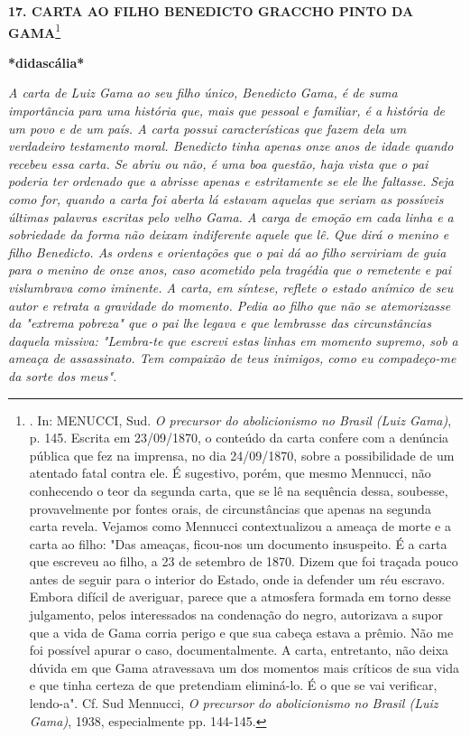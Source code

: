 \textbf{17. CARTA AO FILHO BENEDICTO GRACCHO PINTO DA GAMA}\footnote{.
  In: MENUCCI, Sud. \emph{O precursor do abolicionismo no Brasil (Luiz
  Gama)}, p. 145. Escrita em 23/09/1870, o conteúdo da carta confere com
  a denúncia pública que fez na imprensa, no dia 24/09/1870, sobre a
  possibilidade de um atentado fatal contra ele. É sugestivo, porém, que
  mesmo Mennucci, não conhecendo o teor da segunda carta, que se lê na
  sequência dessa, soubesse, provavelmente por fontes orais, de
  circunstâncias que apenas na segunda carta revela. Vejamos como
  Mennucci contextualizou a ameaça de morte e a carta ao filho: "Das
  ameaças, ficou-nos um documento insuspeito. É a carta que escreveu ao
  filho, a 23 de setembro de 1870. Dizem que foi traçada pouco antes de
  seguir para o interior do Estado, onde ia defender um réu escravo.
  Embora difícil de averiguar, parece que a atmosfera formada em torno
  desse julgamento, pelos interessados na condenação do negro,
  autorizava a supor que a vida de Gama corria perigo e que sua cabeça
  estava a prêmio. Não me foi possível apurar o caso, documentalmente. A
  carta, entretanto, não deixa dúvida em que Gama atravessava um dos
  momentos mais críticos de sua vida e que tinha certeza de que
  pretendiam eliminá-lo. É o que se vai verificar, lendo-a". Cf. Sud
  Mennucci, \emph{O precursor} \emph{do abolicionismo no Brasil (Luiz
  Gama)}, 1938, especialmente pp. 144-145.}

\textbf{*didascália*}

\emph{A carta de Luiz Gama ao seu filho único, Benedicto Gama, é de suma
importância para uma história que, mais que pessoal e familiar, é a
história de um povo e de um país. A carta possui características que
fazem dela um verdadeiro testamento moral. Benedicto tinha apenas onze
anos de idade quando recebeu essa carta. Se abriu ou não, é uma boa
questão, haja vista que o pai poderia ter ordenado que a abrisse apenas
e estritamente se ele lhe faltasse. Seja como for, quando a carta foi
aberta lá estavam aquelas que seriam as possíveis últimas palavras
escritas pelo velho Gama. A carga de emoção em cada linha e a sobriedade
da forma não deixam indiferente aquele que lê. Que dirá o menino e filho
Benedicto. As ordens e orientações que o pai dá ao filho serviriam de
guia para o menino de onze anos, caso acometido pela tragédia que o
remetente e pai vislumbrava como iminente. A carta, em síntese, reflete
o estado anímico de seu autor e retrata a gravidade do momento. Pedia ao
filho que não se atemorizasse da "extrema pobreza" que o pai lhe legava
e que lembrasse das circunstâncias daquela missiva: "Lembra-te que
escrevi estas linhas em momento supremo, sob a ameaça de assassinato.
Tem compaixão de teus inimigos, como eu compadeço-me da sorte dos
meus".}


